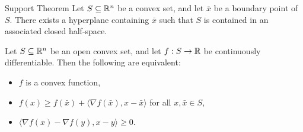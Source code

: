 \begin{thm}{Support Theorem}\label{support-theorem}\proofbreak
    Let $S \subseteq \mathbb{R}^n$ be a convex set, and let $\bar{x}$ be a boundary point of $S$. There exists a hyperplane containing $\bar{x}$ such that $S$ is contained in an associated closed half-space.
\end{thm}

\begin{thm}\label{convex-function-tangent-hyperplane}
    Let $S \subseteq \mathbb{R}^n$ be an open convex set, and let $f: S \to \mathbb{R}$ be continuously differentiable. Then the following are equivalent:
    \begin{itemize}
        \item $f$ is a convex function,
        \item $f(x) \geq f(\bar{x}) + \langle \nabla f(\bar{x}), x - \bar{x}\rangle$ for all $x, \bar{x} \in S$,
        \item $\langle \nabla f(x) - \nabla f(y), x - y \rangle \geq 0$.
    \end{itemize}
\end{thm}

